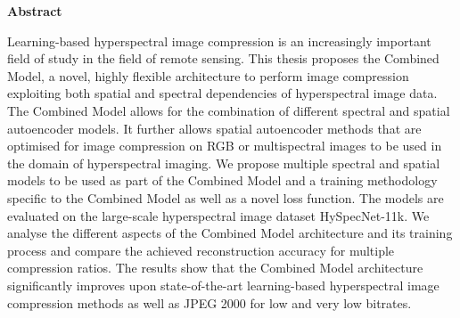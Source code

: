 \thispagestyle{empty}
\vspace*{1.4cm}

\begin{center}
    {\Large \textbf{Abstract}}
\end{center}

\vspace*{0.5cm}

\noindent
Learning-based hyperspectral image compression is an increasingly important field of study in the field of remote sensing. This thesis proposes the Combined Model, a novel, highly flexible architecture to perform image compression exploiting both spatial and spectral dependencies of hyperspectral image data. The Combined Model allows for the combination of different spectral and spatial autoencoder models. It further allows spatial autoencoder methods that are optimised for image compression on RGB or multispectral images to be used in the domain of hyperspectral imaging. We propose multiple spectral and spatial models to be used as part of the Combined Model and a training methodology specific to the Combined Model as well as a novel loss function. The models are evaluated on the large-scale hyperspectral image dataset HySpecNet-11k. We analyse the different aspects of the Combined Model architecture and its training process and compare the achieved reconstruction accuracy for multiple compression ratios. The results show that the Combined Model architecture significantly improves upon state-of-the-art learning-based hyperspectral image compression methods as well as JPEG 2000 for low and very low bitrates.
\\